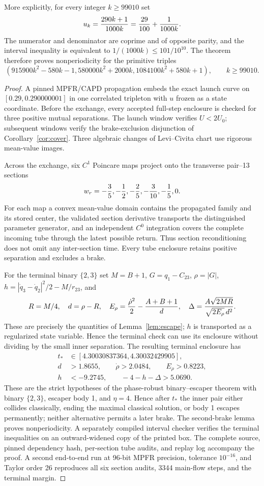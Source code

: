 \documentclass[11pt]{article}
\begin{document}
More explicitly, for every integer $k\ge99010$ set
\[
 u_k={290k+1\over1000k}={29\over100}+{1\over1000k}.
\]
The numerator and denominator are coprime and of opposite parity, and the
interval inequality is equivalent to $1/(1000k)\le101/10^{10}$.  The theorem
therefore proves nonperiodicity for the primitive triples
\[
 \left(915900k^2-580k-1,
       580000k^2+2000k,
       1084100k^2+580k+1\right),
 \qquad k\ge99010.
\]
\begin{proof}
A pinned MPFR/CAPD propagation embeds the exact launch curve on
$[0.29,0.290000001]$ in one correlated tripleton with $u$ frozen as a state
coordinate.  Before the
exchange, every accepted full-step enclosure is checked for three positive
mutual separations. The launch window verifies $U<2U_0$; subsequent windows
verify the brake-exclusion disjunction of Corollary~\ref{cor:cover}.  Three algebraic changes of Levi--Civita chart use rigorous
mean-value images.

Across the exchange, six $C^1$ Poincare maps project onto the transverse
pair--13 sections
\[
 w_r=-{3\over5},-{1\over2},-{2\over5},-{3\over10},-{1\over5},0.
\]
For each map a convex mean-value domain contains the propagated family and
its stored center, the validated section derivative transports the
distinguished parameter generator, and an independent $C^0$ integration
covers the complete incoming tube through the latest possible return.
Thus section reconditioning does not omit any inter-section time.  Every
tube enclosure retains positive separation and excludes a brake.

For the terminal binary $\{2,3\}$ set $M=B+1$, $G=q_1-C_{23}$,
$\rho=|G|$, $h=|\dot q_3-\dot q_2|^2/2-M/r_{23}$, and
\[
 R=M/4,\quad d=\rho-R,\quad
 E_\rho={\dot\rho^2\over2}-{A+B+1\over d},\quad
 \Delta={A\sqrt{2MR}\over\sqrt{2E_\rho}\,d^2}.
\]
These are precisely the quantities of Lemma~\ref{lem:escape}; $h$ is
transported as a regularized state variable. Hence the terminal check can
use its enclosure without dividing by the small inner separation.
The resulting terminal enclosure has
\[
\begin{split}
t_*&\in[4.30030837364,4.30032429905],\\
d&>1.8655,\qquad \dot\rho>2.0484,\qquad E_\rho>0.8223,\\
h&<-9.2745,\qquad -4-h-\Delta>5.0690 .
\end{split}
\]
These are the strict hypotheses of the phase-robust binary--escaper theorem
with binary $\{2,3\}$, escaper body 1, and $\eta=4$.  Hence after $t_*$ the
inner pair either collides classically, ending the maximal classical
solution, or body 1 escapes permanently; neither alternative permits a later
brake.  The second-brake lemma proves nonperiodicity.  A separately compiled
interval checker verifies the terminal inequalities on an outward-widened
copy of the printed box.  The complete source, pinned dependency hash,
per-section tube audits, and replay log accompany the proof.
A second end-to-end run at 96-bit MPFR precision, tolerance $10^{-16}$, and
Taylor order 26 reproduces all six section audits, 3344 main-flow steps, and
the terminal margin.


\end{proof}
\end{document}
